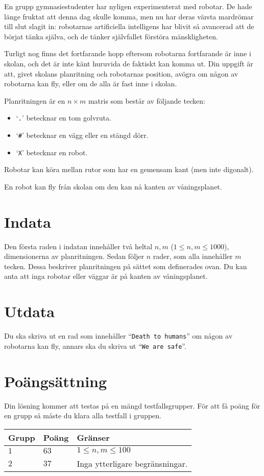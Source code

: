 
En grupp gymnasiestudenter har nyligen experimenterat med robotar. De hade
länge fruktat att denna dag skulle komma, men nu har deras värsta
mardrömar till slut slagit in: robotarnas artificiella intelligens har blivit
så avancerad att de börjat tänka själva, och de tänker självfallet förstöra
mänskligheten.

Turligt nog finns det fortfarande hopp eftersom robotarna fortfarande är inne
i skolan, och det är inte känt huruvida de faktiskt kan komma ut.
Din uppgift är att, givet skolans planritning och robotarnas position, avögra
om någon av robotarna kan fly, eller om de alla är fast inne i skolan.

Planritningen är en $n \times m$ matris som består av följande tecken:

\begin{itemize}
    \item `\texttt{.}' betecknar en tom golvruta.
    \item `\texttt{\#}' betecknar en vägg eller en stängd dörr. 
    \item `\texttt{X}' betecknar en robot.
\end{itemize}

Robotar kan köra mellan rutor som har en gemensam kant (men inte digonalt).

En robot kan fly från skolan om den kan nå kanten av våningsplanet.

\section*{Indata}
Den första raden i indatan innehåller två heltal $n, m$ ($1 \leq n,m \leq 1000$),
dimensionerna av planritningen. Sedan
följer $n$ rader, som alla innehåller $m$ tecken. Dessa beskriver planritningen
på sättet som definerades ovan. Du kan anta att inga robotar eller väggar är på
kanten av våningsplanet.

\section*{Utdata}
Du ska skriva ut en rad som innehåller ``\texttt{Death to humans}'' om någon av robotarna kan
fly, annars ska du skriva ut ``\texttt{We are safe}''.

\section*{Poängsättning}
Din lösning kommer att testas på en mängd testfallsgrupper. För att få poäng
för en grupp så måste du klara alla testfall i gruppen.

\noindent
\begin{tabular}{| l | l | p{12cm} |}
  \hline
  \textbf{Grupp} & \textbf{Poäng} & \textbf{Gränser} \\ \hline
  $1$    & $63$      & $1 \le n, m \le 100$ \\ \hline
  $2$    & $37$      & Inga ytterligare begränsningar. \\ \hline
\end{tabular}
